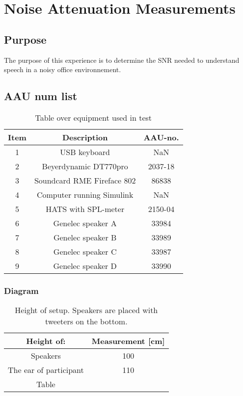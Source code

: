 \section{Noise Attenuation Measurements}

\subsection{Purpose}

The purpose of this experience is to determine the SNR needed to understand speech in a noisy office environnement.  

\subsection{AAU num list}

\begin{table}[h]
	\centering
	
	\begin{tabular}{ c c c } \toprule
		{Item} & {Description} & {AAU-no}. \\ \bottomrule 
		1      	&  USB keyboard							& NaN		\\
		2      	&  Beyerdynamic DT770pro				& 2037-18	\\
		3      	&  Soundcard RME Fireface 802           & 86838		\\
		4      	&  Computer	running Simulink			& NaN		\\  
		5		&  HATS with SPL-meter				& 2150-04	\\
		6      	&  Genelec speaker A					& 33984		\\
		7      	&  Genelec speaker B					& 33989		\\
		8      	&  Genelec speaker C					& 33987		\\
		9      	&  Genelec speaker D					& 33990		\\ \bottomrule 
	\end{tabular}
	\caption{Table over equipment used in test}
	\label{tab:UsedEquipmentListning1}
\end{table}



\subsubsection{Diagram}

\begin{table} [h]
	\centering
	\begin{tabular}{c c} \toprule
		\centering
		Height of:			 			& Measurement [cm] 	\\ \bottomrule
		Speakers					  	& 100				\\
		The ear of participant			& 110				\\ 
		Table							&					\\ \bottomrule 
	\end{tabular}
	\caption{Height of setup. Speakers are placed with tweeters on the bottom.}
	\label{Tab:NoiseAttenuationDimensions}
\end{table}

